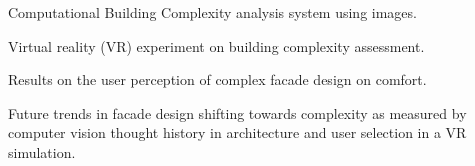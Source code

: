 
\item Computational Building Complexity analysis system using images.
\item Virtual reality (VR) experiment on building complexity assessment.
\item Results on the user perception of complex facade design on comfort.
\item Future trends in facade design shifting towards complexity as measured by computer vision thought history in architecture and user selection in a VR simulation.
